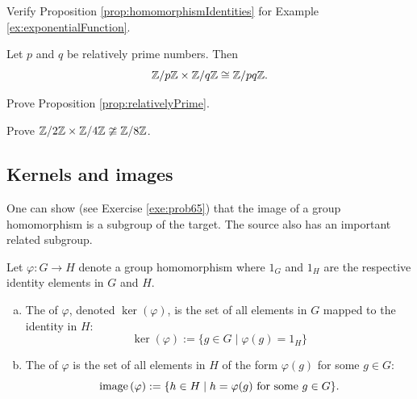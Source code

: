 \documentclass[../algebraNotesMSRI-UP2016.tex]{subfiles}
\begin{document}
\begin{frame}
\begin{exe}\label{exe:homomorphismIdentities}
Verify Proposition \ref{prop:homomorphismIdentities} for Example \ref{ex:exponentialFunction}.
\end{exe}
\begin{prop}\label{prop:relativelyPrime}
Let $p$ and $q$ be relatively prime numbers.  Then
\[
\mathbb Z/p\mathbb Z\times \mathbb Z/q\mathbb Z \cong \mathbb Z/pq\mathbb Z.
\]
\end{prop}
\begin{exe}\label{exe:relativelyPrime}
Prove Proposition \ref{prop:relativelyPrime}.
\end{exe}
\begin{exe}[cf. Problem 64]\label{exe:prob64}
Prove $\mathbb Z/2\mathbb Z\times \mathbb Z/4\mathbb Z \ncong \mathbb Z/8\mathbb Z$.
\end{exe}
\end{frame}

\subsection[\subsecname]{Kernels and images}\label{subsec:kernelsAndImages}
\begin{frame}{\subsecname}
One can show (see Exercise \ref{exe:prob65}) that the image of a group homomorphism is a subgroup of the target.  The source also has an important related subgroup.      
\begin{dfn}
Let $\varphi:G\to H$ denote a group homomorphism where $1_G$ and $1_H$ are the respective identity elements in $G$ and $H$.
\begin{enumerate}[(a)]
\item The  of $\varphi$, denoted $\ker{(\varphi)}$, is the set of all elements in $G$ mapped to the identity in $H$:
\[
\ker{(\varphi)}:=\{g\in G\mid \varphi(g)=1_H\}
\]
\item The  of $\varphi$ is the set of all elements in $H$ of the form $\varphi(g)$ for some $g\in G$:
\[
\operatorname{image}{(\varphi)}:=\{h\in H\mid h=\varphi(g)\text{ for some $g\in G$}\}.
\]
\end{enumerate}
\end{dfn}
\end{frame}
\end{document}
